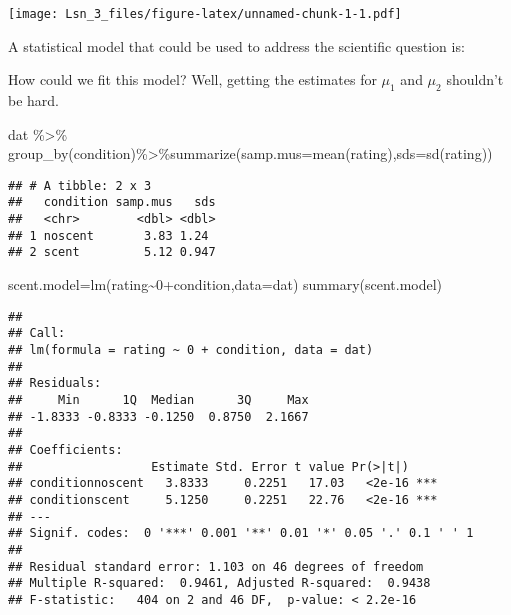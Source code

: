 \documentclass[
]{article}
\newenvironment{Shaded}{\begin{snugshade}}{\end{snugshade}}
\newcommand{\AttributeTok}[1]{\textcolor[rgb]{0.77,0.63,0.00}{#1}}
\newcommand{\DecValTok}[1]{\textcolor[rgb]{0.00,0.00,0.81}{#1}}
\newcommand{\FunctionTok}[1]{\textcolor[rgb]{0.00,0.00,0.00}{#1}}
\newcommand{\NormalTok}[1]{#1}
\newcommand{\OtherTok}[1]{\textcolor[rgb]{0.56,0.35,0.01}{#1}}
\newcommand{\SpecialCharTok}[1]{\textcolor[rgb]{0.00,0.00,0.00}{#1}}
\begin{document}
\texttt{[image: Lsn\_3\_files/figure-latex/unnamed-chunk-1-1.pdf]}

A statistical model that could be used to address the scientific
question is:

\vspace{1.5in}

How could we fit this model? Well, getting the estimates for \(\mu_1\)
and \(\mu_2\) shouldn't be hard.

\begin{Shaded}
\begin{Highlighting}[]
\NormalTok{dat }\SpecialCharTok{\%\textgreater{}\%} \FunctionTok{group\_by}\NormalTok{(condition)}\SpecialCharTok{\%\textgreater{}\%}\FunctionTok{summarize}\NormalTok{(}\AttributeTok{samp.mus=}\FunctionTok{mean}\NormalTok{(rating),}\AttributeTok{sds=}\FunctionTok{sd}\NormalTok{(rating))}
\end{Highlighting}
\end{Shaded}

\begin{verbatim}
## # A tibble: 2 x 3
##   condition samp.mus   sds
##   <chr>        <dbl> <dbl>
## 1 noscent       3.83 1.24 
## 2 scent         5.12 0.947
\end{verbatim}

\begin{Shaded}
\begin{Highlighting}[]
\NormalTok{scent.model}\OtherTok{=}\FunctionTok{lm}\NormalTok{(rating}\SpecialCharTok{\textasciitilde{}}\DecValTok{0}\SpecialCharTok{+}\NormalTok{condition,}\AttributeTok{data=}\NormalTok{dat)}
\FunctionTok{summary}\NormalTok{(scent.model)}
\end{Highlighting}
\end{Shaded}

\begin{verbatim}
## 
## Call:
## lm(formula = rating ~ 0 + condition, data = dat)
## 
## Residuals:
##     Min      1Q  Median      3Q     Max 
## -1.8333 -0.8333 -0.1250  0.8750  2.1667 
## 
## Coefficients:
##                  Estimate Std. Error t value Pr(>|t|)    
## conditionnoscent   3.8333     0.2251   17.03   <2e-16 ***
## conditionscent     5.1250     0.2251   22.76   <2e-16 ***
## ---
## Signif. codes:  0 '***' 0.001 '**' 0.01 '*' 0.05 '.' 0.1 ' ' 1
## 
## Residual standard error: 1.103 on 46 degrees of freedom
## Multiple R-squared:  0.9461, Adjusted R-squared:  0.9438 
## F-statistic:   404 on 2 and 46 DF,  p-value: < 2.2e-16
\end{verbatim}
\end{document}
